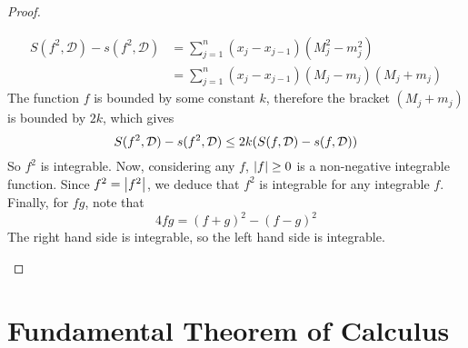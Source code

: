 \documentclass{article}
\begin{document}
\begin{proof}
\begin{enumerate}[(1)]
\begin{align*}
			      S(f^2, \mathcal D) - s(f^2, \mathcal D) & = \sum_{j=1}^n (x_j - x_{j-1})(M_j^2 - m_j^2)        \\
			                                              & = \sum_{j=1}^n (x_j - x_{j-1})(M_j - m_j)(M_j + m_j)
		      \end{align*}
		      The function $f$ is bounded by some constant $k$, therefore the bracket $(M_j + m_j)$ is bounded by $2k$, which gives
		      \[ S(f^2, \mathcal D) - s(f^2, \mathcal D) \leq 2k\qty(S(f, \mathcal D) - s(f, \mathcal D)) \]
		      So $f^2$ is integrable. Now, considering any $f$, $\abs{f} \geq 0$ is a non-negative integrable function. Since $f^2 = \abs{f^2}$, we deduce that $f^2$ is integrable for any integrable $f$. Finally, for $fg$, note that
		      \[ 4fg = (f + g)^2 - (f - g)^2 \]
		      The right hand side is integrable, so the left hand side is integrable.
	\end{enumerate}
\end{proof}

\section{Fundamental Theorem of Calculus}
\end{document}
